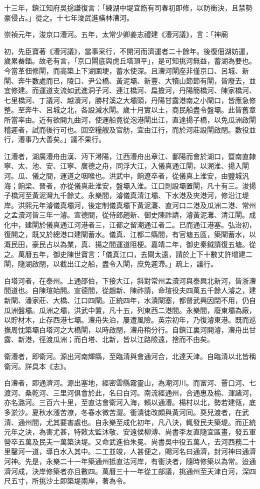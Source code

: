 十三年，鎮江知府吳捴謙復言：「練湖中堤宜飭有司春初即修，以防衝決，且禁勢豪侵占。」從之。十七年浚武進橫林漕河。

崇禎元年，浚京口漕河。五年，太常少卿姜志禮建《漕河議》，言：「神廟

初，先臣寶著《漕河議》，當事采行，不開河而濟運者二十餘年。後復佃湖妨運，歲累畚鍤。故老有言，「京口閘底與虎丘塔頂平」，是可知挑河無益，蓄湖為要也。今當革佃修閘，而高築上下湖圍埂，蓄水使深。且漕河閘座非僅京口、呂城、新閘、奔牛數處而已，陵口、尹公橋、黃泥壩、新豐、大犢山節節有閘，皆廢去，並宜修建。而運道支流如武進洞子河、連江橋河、扁擔河，丹陽簡橋河、陳家橋河、七里橋河、丁議河、越瀆河，勝村溪之大壩頭，丹陽甘露港南之小閘口，皆應急修整。至奔牛、呂城之北，各設減水閘。歲十月實以土，商民船盡令盤壩。此皆舊章所當率由。近有欲開九曲河，使運船竟從泡港閘出江，直達揚子橋，以免瓜洲啟閘稽遲者，試而後行可也。回空糧艘及官舫，宜由江行，而於河莊設閘啟閉。數役並行，漕事乃大善矣。」議不果行。

江漕者，湖廣漕舟由漢、沔下潯陽，江西漕舟出章江、鄱陽而會於湖口，暨南直隸寧、太、池、安、江寧、廣德之舟，同浮大江，入儀真通江閘，以溯淮、揚入閘河。瓜、儀之間，運道之咽喉也。洪武中，餉遼卒者，從儀真上淮安，由鹽城汎海；餉梁、晉者，亦從儀真赴淮安，盤壩入淮。江口則設壩置閘，凡十有三。浚揚子橋河至黃泥灣九千餘丈。永樂間，濬儀真清江壩、下水港及夾港河，修沿江堤岸。洪熙元年濬儀真壩河，後定制儀真壩下黃泥灘、直河口二港及瓜洲二港、常州之孟瀆河皆三年一濬。宣德間，從侍郎趙新、御史陳祚請，濬黃泥灘、清江閘。成化中，建閘於儀真通江河港者三，江都之留潮通江者二。已而通江港塞。弘治初，復開之，既又於總港口建閘蓄水。儀真、江都二縣間，有官塘五區，築閘蓄水，以溉民田，豪民占以為業，真、揚之間運道阻梗。嘉靖二年，御史秦鉞請復五塘。從之。萬曆五年，御史陳世寶言：「儀真江口，去閘太遠，請於上下十數丈許增建二閘，隨湖啟閉，以截出江之船，盡令入閘，庶免遲滯。」疏上，議行。

白塔河者，在泰州。上通邵伯，下接大江，斜對常州孟瀆河與泰興北新河，皆浙漕間道也。自陳瑄始開。宣德間，從趙新、陳祚請，命瑄役夫四萬五千餘人濬之，建新閘、潘家莊、大橋、江口四閘。正統四年，水潰閘塞，都督武興因閉不用，仍自瓜洲盤壩。瓜洲之壩，洪武中置，凡十五，列東西二港間。永樂間，廢東壩為廠，以貯材木，止存西港七壩。漕舟失泊，屢遭風險。英宗初年，乃復濬東港。既而巡撫周忱築壩白塔河之大橋閘，以時啟閉，漕舟稍分行。自鎮江裏河開濬，漕舟出甘露、新港，徑渡瓜洲；而白塔、北新，皆以江路險遠，捨而不由矣。

衛漕者，即衛河。源出河南輝縣，至臨清與會通河合，北達天津。自臨清以北皆稱衛河。詳具本《志》。

白漕者，即通濟河。源出塞地，經密雲縣霧靈山，為潮河川。而富河、罾口河、七渡河、桑乾河、三里河俱會於此，名曰白河。南流經通州，合通惠及榆、渾諸河，亦名潞河。三百六十里，至直沽會衛河入海，賴以通漕。楊村以北，勢若建瓴，底多淤沙。夏秋水漲苦潦，冬春水微苦澀。衝潰徙改頗與黃河同。耎兒渡者，在武清、通州間，尤其要害處也。自永樂至成化初年，凡八決，輒發民夫築堤。而正統元年之決，為害尤甚，特敕太監沐敬、安遠侯柳溥、尚書李友直隨宜區畫，發五軍營卒五萬及民夫一萬築決堤。又命武進伯朱冕、尚書吳中役五萬人，去河西務二十里鑿河一道，導白水入其中。二工並竣，人甚便之，賜河名曰通濟，封河神曰通濟河神。先是，永樂二十一年築通州抵直沽河岸，有衝決者，隨時修築以為常。迨通濟河成，決岸修築者亦且數四。萬曆三十一年從工部議，挑通州至天津白河，深四尺五寸，所挑沙土即築堤兩岸，著為令。

